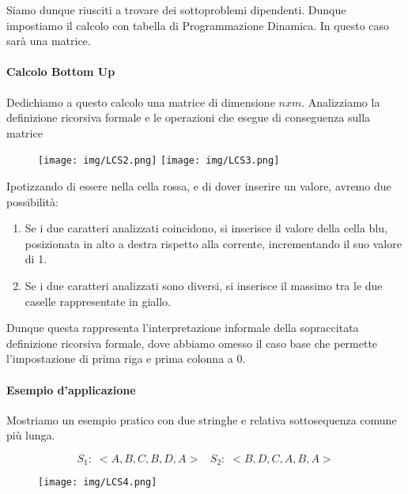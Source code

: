 \documentclass{article}
\begin{document}
Siamo dunque riusciti a trovare dei sottoproblemi dipendenti. Dunque impostiamo il calcolo con tabella di Programmazione Dinamica. In questo caso sarà una matrice.

\newpage

\paragraph{Calcolo Bottom Up}

Dedichiamo a questo calcolo una matrice di dimensione $nxm$. Analizziamo la definizione ricorsiva formale e le operazioni che esegue di conseguenza sulla matrice

\begin{figure}[htbp]
        \center
        \texttt{[image: img/LCS2.png]}
        \texttt{[image: img/LCS3.png]}
\end{figure}

Ipotizzando di essere nella cella rossa, e di dover inserire un valore, avremo due possibilità:

\begin{enumerate}
    \item Se i due caratteri analizzati coincidono, si inserisce il valore della cella blu, posizionata in alto a destra rispetto alla corrente, incrementando il suo valore di 1.
    \item Se i due caratteri analizzati sono diversi, si inserisce il massimo tra le due caselle rappresentate in giallo.
\end{enumerate}

Dunque questa rappresenta l'interpretazione informale della sopraccitata definizione ricorsiva formale, dove abbiamo omesso il caso base che permette l'impostazione di prima riga e prima colonna a 0.

\paragraph{Esempio d'applicazione} Mostriamo un esempio pratico con due stringhe e relativa sottosequenza comune più lunga.

\begin{equation}
    S_{1}: \; <A,B,C,B,D,A> \; \; \; S_{2}: \; <B,D,C,A,B,A> 
\end{equation}

\begin{figure}[htbp]
        \center
        \texttt{[image: img/LCS4.png]}
\end{figure}
\end{document}
